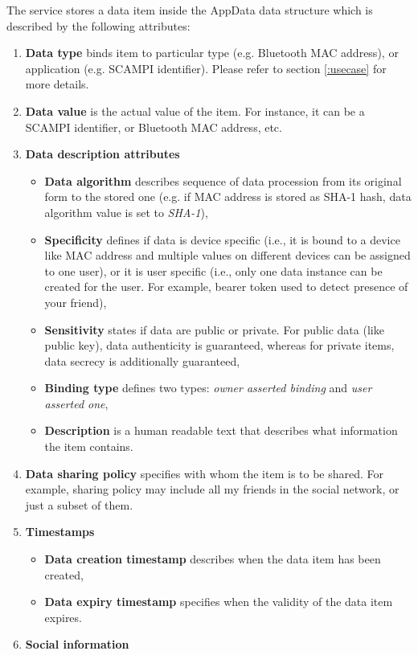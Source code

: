 \documentclass[twocolumn,a4paper,10pt]{article}
\begin{document}
The service stores a data item inside the AppData data structure which is described by the following attributes:
\begin{enumerate}
\item \textbf{Data type} binds item to particular type (e.g. Bluetooth MAC address), or application (e.g. SCAMPI identifier). Please refer to section \ref{:usecase} for more details. 
\item \textbf{Data value} is the actual value of the item. For instance, it can be a SCAMPI identifier, or Bluetooth MAC address, etc.
\item \textbf{Data description attributes}
\begin{itemize}
\item \textbf{Data algorithm} describes sequence of data procession from its original form to the stored one (e.g. if MAC address is stored as SHA-1 hash, data algorithm value is set to \emph{SHA-1}),
\item \textbf{Specificity} defines if data is device specific (i.e., it is bound to a device like MAC address and multiple values on different devices can be assigned to one user), or it is user specific (i.e., only one data instance can be created for the user. For example, bearer token used to detect presence of your friend),
\item \textbf{Sensitivity} states if data are public or private. For public data (like public key), data authenticity is guaranteed, whereas for private items, data secrecy is additionally guaranteed,
\item \textbf{Binding type} defines two types: \emph{owner asserted binding} and \emph{user asserted one},
\item \textbf{Description} is a human readable text that describes what information the item contains.
\end{itemize}
\item \textbf{Data sharing policy} specifies with whom the item is to be shared. For example, sharing policy may include all my friends in the social network, or just a subset of them.
\item \textbf{Timestamps}
\begin{itemize}
\item \textbf{Data creation timestamp} describes when the data item has been created,
\item \textbf{Data expiry timestamp} specifies when the validity of the data item expires.
\end{itemize}
\item \textbf{Social information}

\end{enumerate}
\end{document}
